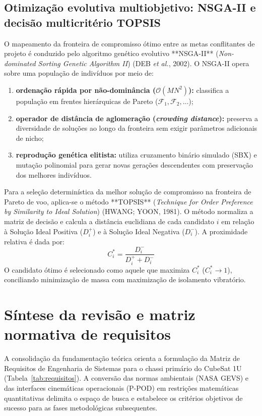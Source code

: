 \subsection{Otimização evolutiva multiobjetivo: NSGA-II e decisão multicritério TOPSIS}
\label{subsec:nsga-topsis-stack}

O mapeamento da fronteira de compromisso ótimo entre as metas conflitantes de projeto é conduzido pelo algoritmo genético evolutivo **NSGA-II** (\textit{Non-dominated Sorting Genetic Algorithm II}) (DEB \textit{et al.}, 2002). O NSGA-II opera sobre uma população de indivíduos por meio de:
\begin{enumerate}
  \item \textbf{ordenação rápida por não-dominância ($\mathcal{O}(M N^2)$):} classifica a população em frentes hierárquicas de Pareto ($\mathcal{F}_1, \mathcal{F}_2, \ldots$);
  \item \textbf{operador de distância de aglomeração (\textit{crowding distance}):} preserva a diversidade de soluções ao longo da fronteira sem exigir parâmetros adicionais de nicho;
  \item \textbf{reprodução genética elitista:} utiliza cruzamento binário simulado (SBX) e mutação polinomial para gerar novas gerações descendentes com preservação dos melhores indivíduos.
\end{enumerate}

Para a seleção determinística da melhor solução de compromisso na fronteira de Pareto de voo, aplica-se o método **TOPSIS** (\textit{Technique for Order Preference by Similarity to Ideal Solution}) (HWANG; YOON, 1981). O método normaliza a matriz de decisão e calcula a distância euclidiana de cada candidato $i$ em relação à Solução Ideal Positiva ($D_i^+$) e à Solução Ideal Negativa ($D_i^-$). A proximidade relativa é dada por:
\begin{equation}
  C_i^* = \frac{D_i^-}{D_i^+ + D_i^-}
  \label{eq:topsis-ci}
\end{equation}
O candidato ótimo é selecionado como aquele que maximiza $C_i^*$ ($C_i^* \to 1$), conciliando minimização de massa com maximização de isolamento vibratório.

\section{Síntese da revisão e matriz normativa de requisitos}
\label{sec:requisitos}

A consolidação da fundamentação teórica orienta a formulação da Matriz de Requisitos de Engenharia de Sistemas para o chassi primário do CubeSat 1U (Tabela~\ref{tab:requisitos}). A conversão das normas ambientais (NASA GEVS) e das interfaces cinemáticas operacionais (P-POD) em restrições matemáticas quantitativas delimita o espaço de busca e estabelece os critérios objetivos de sucesso para as fases metodológicas subsequentes.

